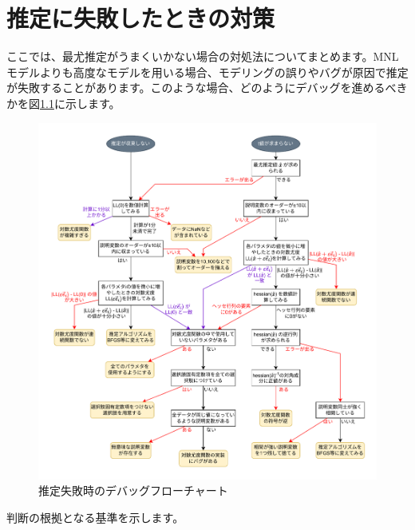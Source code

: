 \chapter{推定に失敗したときの対策}\label{failure}

ここでは、最尤推定がうまくいかない場合の対処法についてまとめます。MNLモデルよりも高度なモデルを用いる場合、モデリングの誤りやバグが原因で推定が失敗することがあります。このような場合、どのようにデバッグを進めるべきかを図\ref{fig:estimation_failure}に示します。

\begin{figure}[ht]
    \centering
    \includegraphics[width=0.95\hsize]{figure/estimation_failure.pdf}
    \caption{推定失敗時のデバッグフローチャート}
    \label{fig:estimation_failure}
\end{figure}

判断の根拠となる基準を示します。

